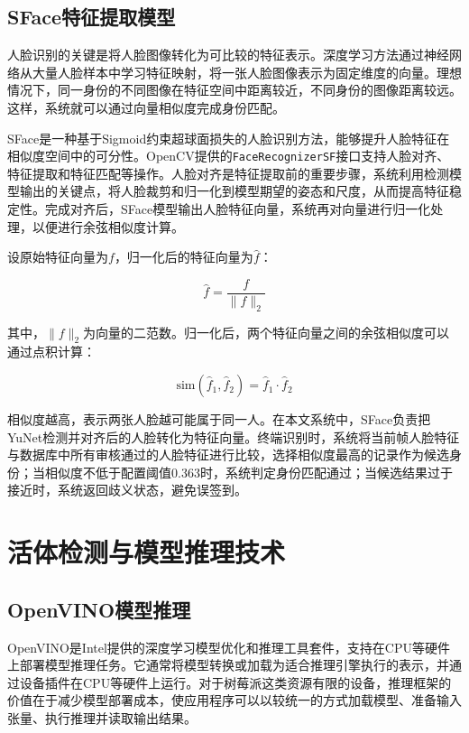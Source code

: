 \subsection{SFace特征提取模型}

人脸识别的关键是将人脸图像转化为可比较的特征表示。深度学习方法通过神经网络从大量人脸样本中学习特征映射，将一张人脸图像表示为固定维度的向量。理想情况下，同一身份的不同图像在特征空间中距离较近，不同身份的图像距离较远。这样，系统就可以通过向量相似度完成身份匹配。

SFace是一种基于Sigmoid约束超球面损失的人脸识别方法，能够提升人脸特征在相似度空间中的可分性\cite{zhong2021sface}。OpenCV提供的\texttt{FaceRecognizerSF}接口支持人脸对齐、特征提取和特征匹配等操作\cite{opencv_facerecognizersf}。人脸对齐是特征提取前的重要步骤，系统利用检测模型输出的关键点，将人脸裁剪和归一化到模型期望的姿态和尺度，从而提高特征稳定性。完成对齐后，SFace模型输出人脸特征向量，系统再对向量进行归一化处理，以便进行余弦相似度计算。

设原始特征向量为$f$，归一化后的特征向量为$\hat{f}$：

\begin{equation}
    \hat{f} = \frac{f}{\|f\|_2}
\end{equation}

其中，$\|f\|_2$为向量的二范数。归一化后，两个特征向量之间的余弦相似度可以通过点积计算：

\begin{equation}
    \text{sim}(\hat{f}_1,\hat{f}_2) = \hat{f}_1 \cdot \hat{f}_2
\end{equation}

相似度越高，表示两张人脸越可能属于同一人。在本文系统中，SFace负责把YuNet检测并对齐后的人脸转化为特征向量。终端识别时，系统将当前帧人脸特征与数据库中所有审核通过的人脸特征进行比较，选择相似度最高的记录作为候选身份；当相似度不低于配置阈值0.363时，系统判定身份匹配通过；当候选结果过于接近时，系统返回歧义状态，避免误签到。

\section{活体检测与模型推理技术}

\subsection{OpenVINO模型推理}

OpenVINO是Intel提供的深度学习模型优化和推理工具套件，支持在CPU等硬件上部署模型推理任务\cite{openvino}。它通常将模型转换或加载为适合推理引擎执行的表示，并通过设备插件在CPU等硬件上运行。对于树莓派这类资源有限的设备，推理框架的价值在于减少模型部署成本，使应用程序可以以较统一的方式加载模型、准备输入张量、执行推理并读取输出结果。

